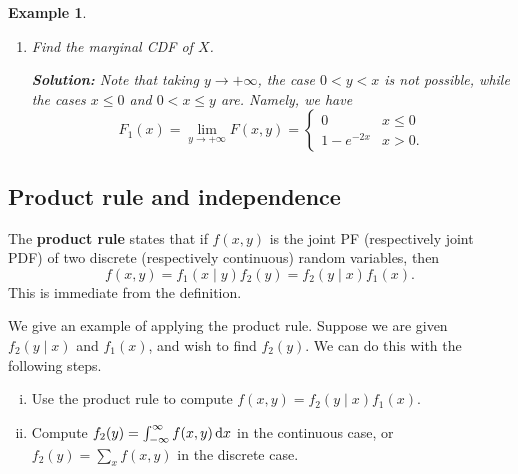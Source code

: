 \documentclass[10pt]{article}
\theoremstyle{newstyle}
\newtheorem{exmp}[thm]{Example}
\begin{document}
\begin{exmp}
\begin{enumerate}[(1)]
\begin{center}
\begin{tikzpicture}[x=0.75pt,y=0.75pt,yscale=-1,xscale=1]
\end{tikzpicture}

\end{center}
    
    {\color{blue}
    Notice that this case simply reduces to Case 2, as we have 
    \[ F(x', y') = F(y', y') = (1-e^{-2y'}) - 2e^{-y'}(1-e^{-y'}) = 1+e^{-2y'} - 2e^{-y'}. \]
    Putting all these together, we have 
    \[ F(x, y) = \begin{cases} 0 & x \leq 0 \text{ or } y \leq 0 \\ 
    (1-e^{-2x}) - 2e^{-y}(1-e^{-x}) & 0 < x \leq y \\ 
    1+e^{-2y} - 2e^{-y} & 0 < y < x. \end{cases} \]
    }
    
    \item Find the marginal CDF of $X$. 
    
    {\color{blue}
    {\bf Solution:} Note that taking $y\to+\infty$, the case $0 < y < x$ is not possible, 
    while the cases $x \leq 0$ and $0 < x \leq y$ are. Namely, we have 
    \[ F_1(x) = \lim_{y\to+\infty} F(x, y) = \begin{cases} 0 & x \leq 0 \\ 1 - e^{-2x} & 
    x > 0. \end{cases} \]
    }
    
\end{enumerate}
\end{exmp}

\subsection{Product rule and independence}

The {\bf product rule} states that if $f(x, y)$ is the joint PF 
(respectively joint PDF) of two discrete (respectively continuous) random variables, then 
\[ f(x, y) = f_1(x \mid y) f_2(y) = f_2(y \mid x) f_1(x). \]
This is immediate from the definition. 

We give an example of applying the product rule. Suppose we are given $f_2(y \mid x)$ and $f_1(x)$, 
and wish to find $f_2(y)$. We can do this with the following steps.
\begin{enumerate}[(i)]
    \item Use the product rule to compute $f(x, y) = f_2(y \mid x) f_1(x)$. 
    \item Compute $f_2(y) = \int_{-\infty}^\infty f(x, y)\,{\rm d}x$ in the continuous case, 
    or $f_2(y) = \sum_{x} f(x, y)$ in the discrete case.
\end{enumerate}
\end{document}
